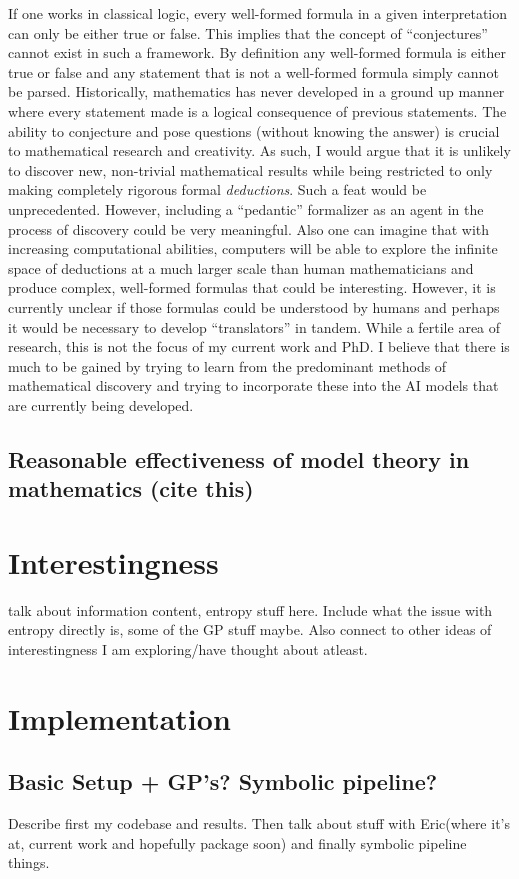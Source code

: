 If one works in classical logic, every well-formed formula in a given interpretation can only be either true or false. This implies that the concept of ``conjectures'' cannot exist in such a framework. By definition any well-formed formula is either true or false
and any statement that is not a well-formed formula simply cannot be parsed. Historically, mathematics has never developed in a ground up manner where every statement made is a logical consequence of previous statements. The ability to conjecture and pose questions (without knowing the answer) is crucial to mathematical research and creativity. As such, I would argue that it is unlikely to discover new, non-trivial mathematical results while being restricted to only making completely rigorous formal \textit{deductions}. Such a feat would be unprecedented.
However, including a ``pedantic'' formalizer as an agent in the process of discovery could be very meaningful. Also one can imagine that with increasing computational abilities, computers will be able to explore the infinite space of deductions at a much larger scale than human mathematicians and produce
complex, well-formed formulas that could be interesting. However, it is currently unclear if those formulas could be understood by humans and perhaps it would be necessary to develop ``translators'' in tandem. While a fertile area of research, this is not the focus of my current work and PhD. I believe that there is much to be gained by trying to learn from the predominant methods of mathematical discovery and trying to incorporate these into the AI models that are currently being developed.

\subsection{Reasonable effectiveness of model theory in mathematics (cite this)}

\section{Interestingness}
talk about information content, entropy stuff here. Include what the issue with entropy directly is, some of the GP stuff maybe. Also connect to other ideas of interestingness I am exploring/have thought about atleast.

\section{Implementation}
\subsection{Basic Setup + GP's? Symbolic pipeline?}
Describe first my codebase and results. Then talk about stuff with Eric(where it's at, current work and hopefully package soon) and finally symbolic pipeline things.
